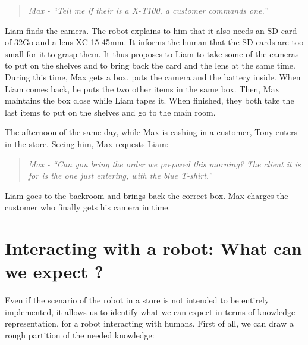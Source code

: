 \begin{quote} 
\centering 
\textit{
Max - ``Tell me if their is a X-T100, a customer commands one.''}
\end{quote}

Liam finds the camera. The robot explains to him that it also needs an SD card of 32Go and a lens XC 15-45mm. It informs the human that the SD cards are too small for it to grasp them. It thus proposes to Liam to take some of the cameras to put on the shelves and to bring back the card and the lens at the same time. During this time, Max gets a box, puts the camera and the battery inside. When Liam comes back, he puts the two other items in the same box. Then, Max maintains the box close while Liam tapes it. When finished, they both take the last items to put on the shelves and go to the main room.

The afternoon of the same day, while Max is cashing in a customer, Tony enters in the store. Seeing him, Max requests Liam:

\begin{quote} 
\centering 
\textit{
Max - ``Can you bring the order we prepared this morning? The client it is for is the one just entering, with the blue T-shirt.''}
\end{quote}

Liam goes to the backroom and brings back the correct box. Max charges the customer who finally gets his camera in time.

\section{Interacting with a robot: What can we expect ?}

Even if the scenario of the robot in a store is not intended to be entirely implemented, it allows us to identify what we can expect in terms of knowledge representation, for a robot interacting with humans. First of all, we can draw a rough partition of the needed knowledge:


